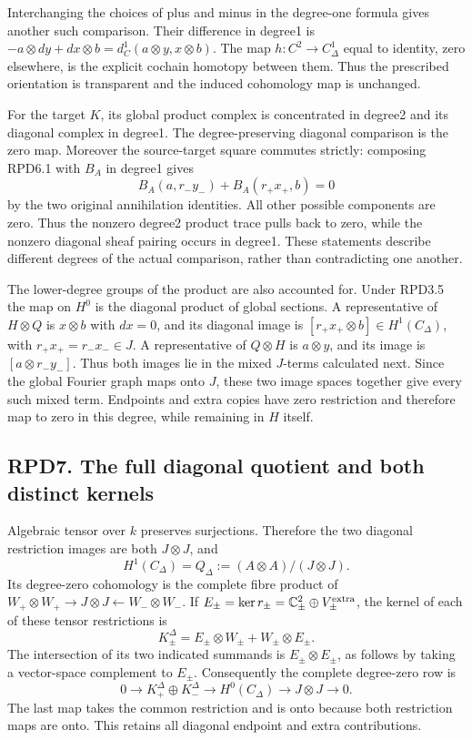 Interchanging the choices of plus and minus in the degree-one formula
gives another such comparison. Their difference in degree1 is
\(-a\otimes dy+dx\otimes b=d_C^1(a\otimes y,x\otimes b)\). The map
\(h:C^2\to C_\Delta^1\) equal to identity, zero elsewhere, is the
explicit cochain homotopy between them. Thus the prescribed orientation
is transparent and the induced cohomology map is unchanged.

For the target \(K\), its global product complex is concentrated in
degree2 and its diagonal complex in degree1. The degree-preserving
diagonal comparison is the zero map. Moreover the source-target square
commutes strictly: composing RPD6.1 with \(B_A\) in degree1 gives \[
B_A(a,r_-y_-)+B_A(r_+x_+,b)=0
\tag{RPD6.3}
\] by the two original annihilation identities. All other possible
components are zero. Thus the nonzero degree2 product trace pulls back
to zero, while the nonzero diagonal sheaf pairing occurs in degree1.
These statements describe different degrees of the actual comparison,
rather than contradicting one another.

The lower-degree groups of the product are also accounted for. Under
RPD3.5 the map on \(H^0\) is the diagonal product of global sections. A
representative of \(H\otimes Q\) is \(x\otimes b\) with \(dx=0\), and
its diagonal image is \([r_+x_+\otimes b]\in H^1(C_\Delta)\), with
\(r_+x_+=r_-x_-\in J\). A representative of \(Q\otimes H\) is
\(a\otimes y\), and its image is \([a\otimes r_-y_-]\). Thus both images
lie in the mixed \(J\)-terms calculated next. Since the global Fourier
graph maps onto \(J\), these two image spaces together give every such
mixed term. Endpoints and extra copies have zero restriction and
therefore map to zero in this degree, while remaining in \(H\) itself.

\subsection{RPD7. The full diagonal quotient and both distinct
kernels}\label{rpd7.-the-full-diagonal-quotient-and-both-distinct-kernels}

Algebraic tensor over \(k\) preserves surjections. Therefore the two
diagonal restriction images are both \(J\otimes J\), and \[
\boxed{H^1(C_\Delta)=Q_\Delta:=(A\otimes A)/(J\otimes J).}
\tag{RPD7.1}
\] Its degree-zero cohomology is the complete fibre product of
\(W_+\otimes W_+\to J\otimes J\leftarrow W_-\otimes W_-\). If
\(E_\pm=\ker r_\pm=\mathbb C^2_\pm\oplus V_\pm^{\rm extra}\), the kernel
of each of these tensor restrictions is \[
K_\pm^\Delta=
E_\pm\otimes W_\pm+W_\pm\otimes E_\pm.
\] The intersection of its two indicated summands is
\(E_\pm\otimes E_\pm\), as follows by taking a vector-space complement
to \(E_\pm\). Consequently the complete degree-zero row is \[
0\to K_+^\Delta\oplus K_-^\Delta
\to H^0(C_\Delta)\to J\otimes J\to0.
\tag{RPD7.2}
\] The last map takes the common restriction and is onto because both
restriction maps are onto. This retains all diagonal endpoint and extra
contributions.

